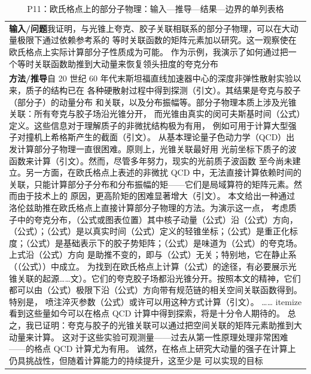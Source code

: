 \documentclass[UTF8,11pt,oneside]{ctexbook}
\begin{document}
\begin{table}[htbp]
  \centering
  \caption*{P11：欧氏格点上的部分子物理：输入—推导—结果—边界的单列表格}
  \small
  \begin{tabular}{@{}p{}@{}}
    \toprule
    \textbf{输入/问题}\quad 我证明，与光锥上夸克、胶子关联相联系的部分子物理，可以在大动量极限下通过依赖参考系的 等时关联函数的矩阵元素加以研究。这一观察使在欧氏格点上实际计算部分子性质成为可能。 作为示例，我演示了如何通过把一个等时关联函数助推到大动量来恢复领头扭度的夸克分布 \\
    \textbf{方法/推导}\quad 自 20 世纪 60 年代末斯坦福直线加速器中心的深度非弹性散射实验以来，质子的结构已在 各种硬散射过程中得到探测（引文）。其结果是夸克与胶子（部分子）的动量分布 和关联，以及分布振幅等。部分子物理本质上涉及光锥关联：所有夸克与胶子场沿光锥分开， 而光锥由真实的闵可夫斯基时间（公式）定义。这些信息对于理解质子的非微扰结构极为有用， 例如可用于计算大型强子对撞机上希格斯产生的截面（引文）。 从基本理论量子色动力学（QCD）出发计算部分子物理一直很困难。原则上，光锥关联最好用 光前坐标下质子的波函数来计算（引文）。然而，尽管多年努力，现实的光前质子波函数 至今尚未建立。另一方面，在欧氏格点上表述的非微扰 QCD 中，无法直接计算依赖时间的 关联，只能计算部分子分布和分布振幅的矩——它们是局域算符的矩阵元素。然而由于技术上的 原因，更高阶矩的困难显著增大（引文）。 本文给出一种通过洛伦兹助推在欧氏格点上直接计算部分子物理的方法。为演示这一点， 考虑质子中的夸克分布，（公式或图表位置）其中核子动量（公式）沿（公式）方向，（公式）；（公式）是以真实时间（公式）定义的轻锥坐标；（公式）是重正化标度；（公式）是基础表示下的胶子势矩阵；（公式）是味道为（公式）的夸克场。上式沿（公式）方向 是助推不变的，即与（公式）无关；特别地，它在静止系（（公式））中成立。 为找到在欧氏格点上计算（公式）的途径，有必要展示光锥关联的起源……文）。它们的夸克胶子场都沿光锥分开。按照本文的精神，它们都可以由（公式）极限下沿（公式）方向带有规范链的相关空间关联函数得到。特别是， 喷注淬灭参数（公式）或许可以用这种方式计算（引文）。 …… itemize 看到这些量如今可以在格点 QCD 计算中得到探索，将是十分令人期待的。 总之，我已证明：夸克与胶子的光锥关联可以通过把空间关联的矩阵元素助推到大动量来计算。 这对于这些实验可观测量——过去从第一性原理处理非常困难——的格点 QCD 计算尤为有用。 诚然，在格点上研究大动量的强子在计算上仍具挑战性，但随着计算能力的持续提升，这至少是 可以实现的目标 \\

\end{tabular}
\end{table}
\end{document}
